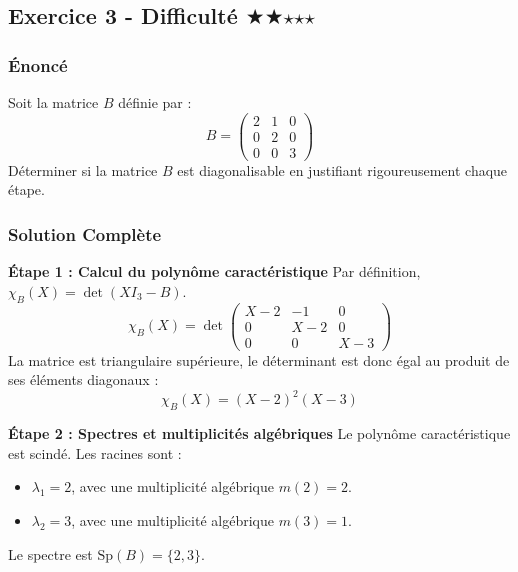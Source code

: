 \documentclass[11pt,a4paper]{article}
\begin{document}
\subsection*{Exercice 3 - Difficulté \quad $\bigstar$$\bigstar$$\star$$\star$$\star$}

\subsubsection*{Énoncé}
Soit la matrice $B$ définie par :
$$B = \begin{pmatrix} 2 & 1 & 0 \\ 0 & 2 & 0 \\ 0 & 0 & 3 \end{pmatrix}$$
Déterminer si la matrice $B$ est diagonalisable en justifiant rigoureusement chaque étape.

\subsubsection*{Solution Complète}

\textbf{Étape 1 : Calcul du polynôme caractéristique}
Par définition, $\chi_B(X) = \det(X I_3 - B)$.
$$\chi_B(X) = \det\begin{pmatrix} X - 2 & -1 & 0 \\ 0 & X - 2 & 0 \\ 0 & 0 & X - 3 \end{pmatrix}$$
La matrice est triangulaire supérieure, le déterminant est donc égal au produit de ses éléments diagonaux :
$$\chi_B(X) = (X-2)^2(X-3)$$

\textbf{Étape 2 : Spectres et multiplicités algébriques}
Le polynôme caractéristique est scindé. Les racines sont :
\begin{itemize}
\item $\lambda_1 = 2$, avec une multiplicité algébrique $m(2) = 2$.
\item $\lambda_2 = 3$, avec une multiplicité algébrique $m(3) = 1$.
\end{itemize}
Le spectre est $\text{Sp}(B) = \{2, 3\}$.
\end{document}
